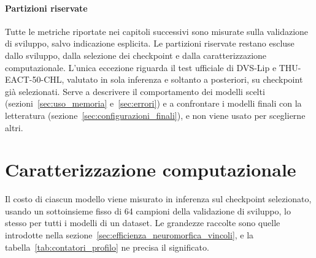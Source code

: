 \paragraph{Partizioni riservate}
\label{subsec:partizioni_riservate}
Tutte le metriche riportate nei capitoli successivi sono misurate sulla validazione di sviluppo, salvo indicazione esplicita. Le partizioni riservate restano escluse dallo sviluppo, dalla selezione dei checkpoint e dalla caratterizzazione computazionale. L'unica eccezione riguarda il test ufficiale di DVS-Lip e THU-EACT-50-CHL, valutato in sola inferenza e soltanto a posteriori, su checkpoint già selezionati. Serve a descrivere il comportamento dei modelli scelti (sezioni~\ref{sec:uso_memoria} e~\ref{sec:errori}) e a confrontare i modelli finali con la letteratura (sezione~\ref{sec:configurazioni_finali}), e non viene usato per sceglierne altri.



\section{Caratterizzazione computazionale}
\label{sec:caratterizzazione_computazionale}

Il costo di ciascun modello viene misurato in inferenza sul checkpoint selezionato, usando un sottoinsieme fisso di 64 campioni della validazione di sviluppo, lo stesso per tutti i modelli di un dataset. Le grandezze raccolte sono quelle introdotte nella sezione~\ref{sec:efficienza_neuromorfica_vincoli}, e la tabella~\ref{tab:contatori_profilo} ne precisa il significato.

